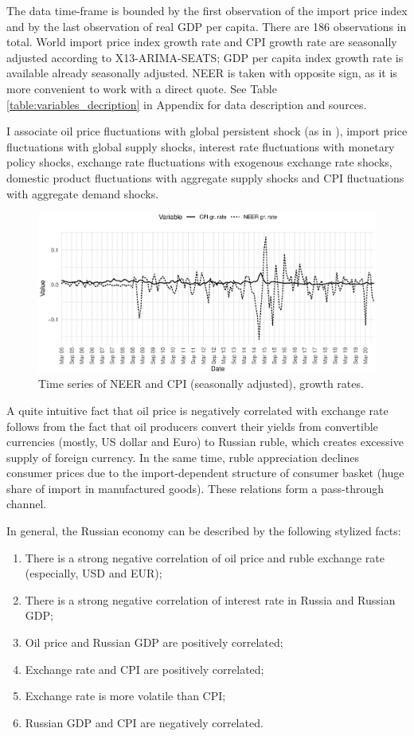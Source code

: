 \documentclass[12pt, a4paper]{extarticle}
\begin{document}
The data time-frame is bounded by the first observation of the import price index and by the last observation of real GDP per capita. There are 186 observations in total. World import price index growth rate and CPI growth rate are seasonally adjusted according to X13-ARIMA-SEATS; GDP per capita index growth rate is available already seasonally adjusted. NEER is taken with opposite sign, as it is more convenient to work with a direct quote. See Table \ref{table:variables_decription} in Appendix for data description and sources.

I associate oil price fluctuations with global persistent shock (as in \cite{Forbes2018}), import price fluctuations with global supply shocks, interest rate fluctuations with monetary policy shocks, exchange rate fluctuations with exogenous exchange rate shocks, domestic product fluctuations with aggregate supply shocks and CPI fluctuations with aggregate demand shocks.
\begin{figure}[b!]
	\centering
	\includegraphics[width=\linewidth]{figures/neer_cpi}
	\caption[]{Time series of NEER and CPI (seasonally adjusted), growth rates.}
	\label{fig:neer_cpi}
\end{figure}

A quite intuitive fact that oil price is negatively correlated with exchange rate follows from the fact that oil producers convert their yields from convertible currencies (mostly, US dollar and Euro) to Russian ruble, which creates excessive supply of foreign currency. In the same time, ruble appreciation declines consumer prices due to the import-dependent structure of consumer basket (huge share of import in manufactured goods). These relations form a pass-through channel. 

In general, the Russian economy can be described by the following stylized facts:
\begin{enumerate}
	\setlength\itemsep{0.02em}
	\item There is a strong negative correlation of oil price and ruble exchange rate (especially, USD and EUR);
	\item There is a strong negative correlation of interest rate in Russia and Russian GDP;
	\item Oil price and Russian GDP are positively correlated;
	\item Exchange rate and CPI are positively correlated;
	\item Exchange rate is more volatile than CPI;
	\item Russian GDP and CPI are negatively correlated.
\end{enumerate}
\end{document}

